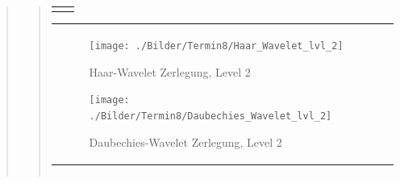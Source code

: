 \begin{quote}
\begin{quote}
\begin{center}
\begin{tabular}{ll}
\begin{minipage}{0.6\textwidth}
                    \end{minipage}
    
                \end{tabular}
                \end{center}
                
       
        \begin{center}
                \begin{tabular}{ll}
    
                \hspace{-12em}
                    \begin{minipage}{0.6\textwidth}
    
                        \begin{figure}[H]
                            \label{fig:}
                            \texttt{[image: ./Bilder/Termin8/Haar\_Wavelet\_lvl\_2]}
                            \caption{Haar-Wavelet Zerlegung, Level 2}
                        \end{figure}
    
                    \end{minipage}
                    \begin{minipage}{0.6\textwidth}
    
                        \begin{figure}[H]
                            \label{fig:}
                            \texttt{[image: ./Bilder/Termin8/Daubechies\_Wavelet\_lvl\_2]}
                            \caption{Daubechies-Wavelet Zerlegung, Level 2}
                        \end{figure}
                    \vspace{-1.5em}
    
                    \end{minipage}
    
                \end{tabular}
                \end{center}
                
                
                
          \begin{center}
                \begin{tabular}{ll}
    

\end{tabular}
\end{center}
\end{quote}
\end{quote}
